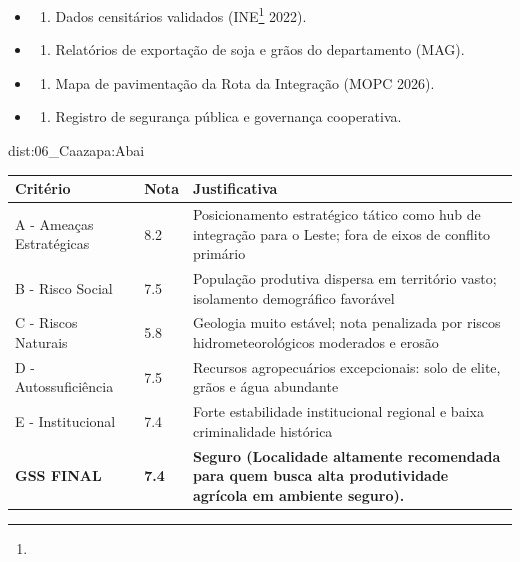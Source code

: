 {\begin{itemize}
\tightlist
\item
  \begin{enumerate}
  \def\labelenumi{\arabic{enumi})}
  \tightlist
  \item
    Dados censitários validados (INE\footnote{\fineINE} 2022).
  \end{enumerate}
\item
  \begin{enumerate}
  \def\labelenumi{\arabic{enumi})}
  \setcounter{enumi}{1}
  \tightlist
  \item
    Relatórios de exportação de soja e grãos do departamento (MAG).
  \end{enumerate}
\item
  \begin{enumerate}
  \def\labelenumi{\arabic{enumi})}
  \setcounter{enumi}{2}
  \tightlist
  \item
    Mapa de pavimentação da Rota da Integração (MOPC 2026).
  \end{enumerate}
\item
  \begin{enumerate}
  \def\labelenumi{\arabic{enumi})}
  \setcounter{enumi}{3}
  \tightlist
  \item
    Registro de segurança pública e governança cooperativa.
  \end{enumerate}
\end{itemize}}{dist:06_Caazapa:Abai}
\begin{table}[ht!]
\small \begin{tabular}{p{3.0cm}p{0.8cm}p{6.0cm}} \toprule
\textbf{Critério} & \textbf{Nota} & \textbf{Justificativa} \\ \midrule
A - Ameaças Estratégicas & 8.2 & Posicionamento estratégico tático como hub de integração para o Leste; fora de eixos de conflito primário \\
B - Risco Social & 7.5 & População produtiva dispersa em território vasto; isolamento demográfico favorável \\
C - Riscos Naturais & 5.8 & Geologia muito estável; nota penalizada por riscos hidrometeorológicos moderados e erosão \\
D - Autossuficiência & 7.5 & Recursos agropecuários excepcionais: solo de elite, grãos e água abundante \\
E - Institucional & 7.4 & Forte estabilidade institucional regional e baixa criminalidade histórica \\
\midrule \textbf{GSS FINAL} & \textbf{7.4} & \textbf{Seguro (Localidade altamente recomendada para quem busca alta produtividade agrícola em ambiente seguro).} \\ \bottomrule \end{tabular}
\end{table}
